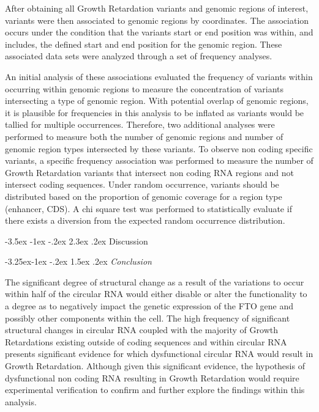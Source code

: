 \documentclass[11pt]{article}
\makeatletter
\renewcommand\section{\@startsection {section}{1}{\z@}%
                                       {-3.5ex \@plus -1ex \@minus -.2ex}%
                                       {2.3ex \@plus.2ex}%
                                       {\normalfont\fontfamily{phv}\fontsize{16}{19}\bfseries}}
\renewcommand\subsection{\@startsection{subsection}{2}{\z@}%
                                         {-3.25ex\@plus -1ex \@minus -.2ex}%
                                         {1.5ex \@plus .2ex}%
                                         {\normalfont\fontfamily{phv}\fontsize{14}{17}\bfseries}}
\makeatother
\begin{document}
After obtaining all Growth Retardation variants and genomic regions of interest, variants were then associated to genomic regions by coordinates. The association occurs under the condition that the variants start or end position was within, and includes, the defined start and end position for the genomic region. These associated data sets were analyzed through a set of frequency analyses. 

An initial analysis of these associations evaluated the frequency of variants within occurring within genomic regions to measure the concentration of variants intersecting a type of genomic region. With potential overlap of genomic regions, it is plausible for frequencies in this analysis to be inflated as variants would be tallied for multiple occurrences. Therefore, two additional analyses were performed to measure both the number of genomic regions and number of genomic region types intersected by these variants. To observe non coding specific variants, a specific frequency association was performed to measure the number of Growth Retardation variants that intersect non coding RNA regions and not intersect coding sequences. Under random occurrence, variants should be distributed based on the proportion of genomic coverage for a region type (enhancer, CDS). A chi square test was performed to statistically evaluate if there exists a diversion from the expected random occurrence distribution.  

\section{Discussion} \label{s:discussion}

\subsection{
\emph{Conclusion}} \label{s:conclusion}

The significant degree of structural change as a result of the variations to occur within half of the circular RNA would either disable or alter the functionality to a degree as to negatively impact the genetic expression of the FTO gene and possibly other components within the cell. The high frequency of significant structural changes in circular RNA coupled with the majority of Growth Retardations existing outside of coding sequences and within circular RNA presents significant evidence for which dysfunctional circular RNA would result in Growth Retardation. Although given this significant evidence, the hypothesis of dysfunctional non coding RNA resulting in Growth Retardation would require experimental verification to confirm and further explore the findings within this analysis. 
\end{document}
